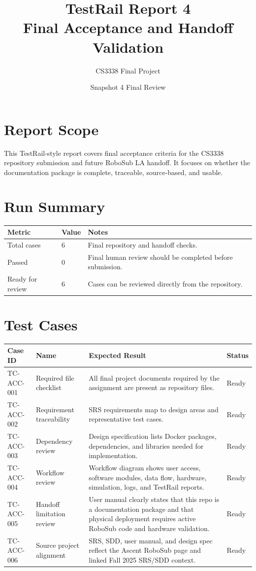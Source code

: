 \documentclass[12pt]{article}
\title{TestRail Report 4\\Final Acceptance and Handoff Validation}
\author{CS3338 Final Project}
\date{Snapshot 4 Final Review}
\begin{document}
\maketitle

\section{Report Scope}
This TestRail-style report covers final acceptance criteria for the CS3338 repository submission and future RoboSub LA handoff. It focuses on whether the documentation package is complete, traceable, source-based, and usable.

\section{Run Summary}
\begin{longtable}{|p{}|p{}|p{}|}
\hline
\textbf{Metric} & \textbf{Value} & \textbf{Notes} \\
\hline
Total cases & 6 & Final repository and handoff checks. \\
\hline
Passed & 0 & Final human review should be completed before submission. \\
\hline
Ready for review & 6 & Cases can be reviewed directly from the repository. \\
\hline
\end{longtable}

\section{Test Cases}
\begin{longtable}{|p{}|p{}|p{}|p{}|}
\hline
\textbf{Case ID} & \textbf{Name} & \textbf{Expected Result} & \textbf{Status} \\
\hline
TC-ACC-001 & Required file checklist & All final project documents required by the assignment are present as repository files. & Ready \\
\hline
TC-ACC-002 & Requirement traceability & SRS requirements map to design areas and representative test cases. & Ready \\
\hline
TC-ACC-003 & Dependency review & Design specification lists Docker packages, dependencies, and libraries needed for implementation. & Ready \\
\hline
TC-ACC-004 & Workflow review & Workflow diagram shows user access, software modules, data flow, hardware, simulation, logs, and TestRail reports. & Ready \\
\hline
TC-ACC-005 & Handoff limitation review & User manual clearly states that this repo is a documentation package and that physical deployment requires active RoboSub code and hardware validation. & Ready \\
\hline
TC-ACC-006 & Source project alignment & SRS, SDD, user manual, and design spec reflect the Ascent RoboSub page and linked Fall 2025 SRS/SDD context. & Ready \\
\hline
\end{longtable}
\end{document}
